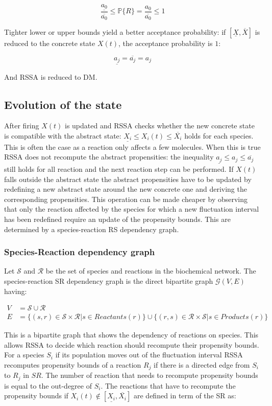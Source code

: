     $$\frac{\underline{a_0}}{\overline{a_0}} \le \mathbb{P}\{R\} = \frac{a_0}{\overline{a_0}} \le 1$$

    Tighter lower or upper bounds yield a better acceptance probability: if $[\underline{X},\overline{X}]$ is reduced to the concrete state $X(t)$, the acceptance probability is $1$:

    $$\underline{a_j}= \overline{a_j} = a_j$$

    And RSSA is reduced to DM.

  \subsection{Evolution of the state}
  After firing $X(t)$ is updated and RSSA checks whether the new concrete state is compatible with the abstract state: $\underline{X_i}\le X_i(t)\le \overline{X_i}$ holds for each species.
  This is often the case as a reaction only affects a few molecules.
  When this is true RSSA does not recompute the abstract propensities: the inequality $\underline{a_j}\le a_j\le \overline{a_j}$ still holds for all reaction and the next reaction step can be performed.
  If $X(t)$ falls outside the abstract state the abstract propensities have to be updated by redefining a new abstract state around the new concrete one and deriving the corresponding propensities.
  This operation can be made cheaper by observing that only the reaction affected by the species for which a new fluctuation interval has been redefined require an update of the propensity bounds.
  This are determined by a species-reaction RS dependency graph.

    \subsubsection{Species-Reaction dependency graph}
    Let $\mathcal{S}$ and $\mathcal{R}$ be the set of species and reactions in the biochemical network.
    The species-reaction SR dependency graph is the direct bipartite graph $\mathcal{G}(V, E)$ having:

    \begin{align*}
      V &=\mathcal{S}\cup\mathcal{R}\\
      E &=\{(s,r)\in\mathcal{S}\times\mathcal{R}|s\in Reactants(r)\}\cup\{(r,s)\in \mathcal{R}\times\mathcal{S}|s\in Products(r)\}
    \end{align*}

    This is a bipartite graph that shows the dependency of reactions on species.
    This allows RSSA to decide which reaction should recompute their propensity bounds.
    For a species $S_i$ if its population moves out of the fluctuation interval RSSA recomputes propensity bounds of a reaction $R_j$ if there is a directed edge from $S_i$ to $R_j$ in $SR$.
    The number of reaction that needs to recompute propensity bounds is equal to the out-degree of $S_i$.
    The reactions that have to recompute the propensity bounds if $X_i(t)\not\in[\underline{X_i},\overline{X_i}]$ are defined in term of the SR as:

